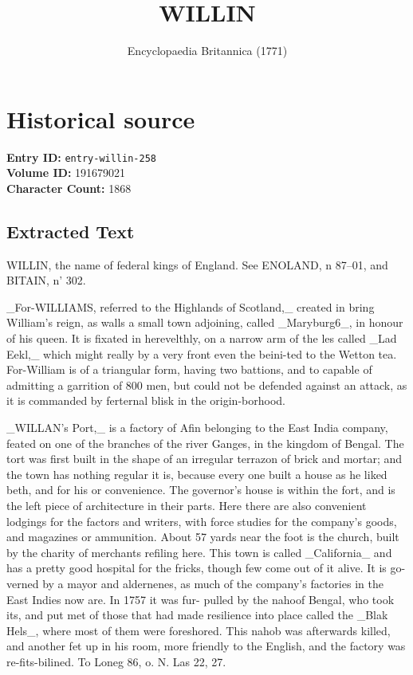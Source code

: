 \documentclass{article}
\title{WILLIN}
\date{Encyclopaedia Britannica (1771)}
\begin{document}
\maketitle

\section*{Historical source}
\textbf{Entry ID:} \texttt{entry-willin-258} \\
\textbf{Volume ID:} 191679021 \\
\textbf{Character Count:} 1868

\subsection*{Extracted Text}
WILLIN, the name of federal kings of England. See ENOLAND, n 87--01, and BITAIN, n' 302.

\_For-WILLIAMS, referred to the Highlands of Scotland,\_ created in bring William's reign, as walls a small town adjoining, called \_Maryburg6\_, in honour of his queen. It is fixated in herevelthly, on a narrow arm of the les called \_Lad Eekl,\_ which might really by a very front even the beini-ted to the Wetton tea. For-William is of a triangular form, having two battions, and to capable of admitting a garrition of 800 men, but could not be defended against an attack, as it is commanded by ferternal blisk in the origin-borhood.

\_WILLAN’s Port,\_ is a factory of Afin belonging to the East India company, feated on one of the branches of the river Ganges, in the kingdom of Bengal. The tort was first built in the shape of an irregular terrazon of brick and mortar; and the town has nothing regular it is, because every one built a house as he liked beth, and for his or convenience. The governor's house is within the fort, and is the left piece of architecture in their parts. Here there are also convenient lodgings for the factors and writers, with force studies for the company's goods, and magazines or ammunition. About 57 yards near the foot is the church, built by the charity of merchants refiling here. This town is called \_California\_ and has a pretty good hospital for the fricks, though few come out of it alive. It is go-verned by a mayor and aldernenes, as much of the company's factories in the East Indies now are. In 1757 it was fur- pulled by the nahoof Bengal, who took its, and put met of those that had made resilience into place called the \_Blak Hels\_, where most of them were foreshored. This nahob was afterwards killed, and another fet up in his room, more friendly to the English, and the factory was re-fits-bilined. To Loneg 86, o. N. Las 22, 27.
\end{document}
